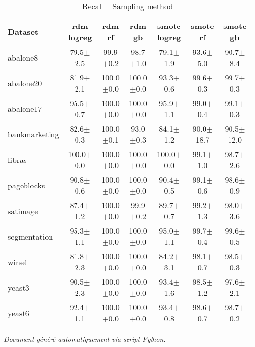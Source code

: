 \documentclass[a4paper,12pt]{article}
\begin{document}
\vspace{1cm}

\centering

\begin{table}
\caption{Recall -- Sampling method}
\label{tab:results}
\begin{tabular}{lcccccc}
\toprule
Dataset & rdm logreg & rdm rf & rdm gb & smote logreg & smote rf & smote gb \\
\midrule
abalone8 & 79.5$\pm$2.5 & 99.9$\pm$0.2 & 98.7$\pm$1.0 & 79.1$\pm$1.9 & 93.6$\pm$5.0 & 90.7$\pm$8.4 \\
abalone20 & 81.9$\pm$2.1 & 100.0$\pm$0.0 & 100.0$\pm$0.0 & 93.3$\pm$0.6 & 99.6$\pm$0.3 & 99.7$\pm$0.3 \\
abalone17 & 95.5$\pm$0.7 & 100.0$\pm$0.0 & 100.0$\pm$0.0 & 95.9$\pm$1.1 & 99.0$\pm$0.4 & 99.1$\pm$0.3 \\
bankmarketing & 82.6$\pm$0.3 & 100.0$\pm$0.1 & 93.0$\pm$0.3 & 84.1$\pm$1.2 & 90.0$\pm$18.7 & 90.5$\pm$12.0 \\
libras & 100.0$\pm$0.0 & 100.0$\pm$0.0 & 100.0$\pm$0.0 & 100.0$\pm$0.0 & 99.1$\pm$1.0 & 98.7$\pm$2.6 \\
pageblocks & 90.8$\pm$0.6 & 100.0$\pm$0.0 & 100.0$\pm$0.0 & 90.4$\pm$0.5 & 99.1$\pm$0.6 & 98.6$\pm$0.9 \\
satimage & 87.4$\pm$1.2 & 100.0$\pm$0.0 & 99.9$\pm$0.2 & 89.7$\pm$0.7 & 99.2$\pm$1.3 & 98.0$\pm$3.6 \\
segmentation & 95.3$\pm$1.1 & 100.0$\pm$0.0 & 100.0$\pm$0.0 & 95.0$\pm$1.1 & 99.7$\pm$0.4 & 99.6$\pm$0.5 \\
wine4 & 81.8$\pm$2.3 & 100.0$\pm$0.0 & 100.0$\pm$0.0 & 84.2$\pm$3.1 & 98.1$\pm$0.7 & 98.5$\pm$0.3 \\
yeast3 & 90.5$\pm$2.3 & 100.0$\pm$0.0 & 100.0$\pm$0.0 & 93.4$\pm$1.6 & 98.5$\pm$1.2 & 97.6$\pm$2.1 \\
yeast6 & 92.4$\pm$1.1 & 100.0$\pm$0.0 & 100.0$\pm$0.0 & 93.4$\pm$0.8 & 98.6$\pm$0.7 & 98.7$\pm$0.2 \\
\bottomrule
\end{tabular}
\end{table}


\vfill
\begin{center}
    \textit{Document généré automatiquement via script Python.}
\end{center}
\end{document}
